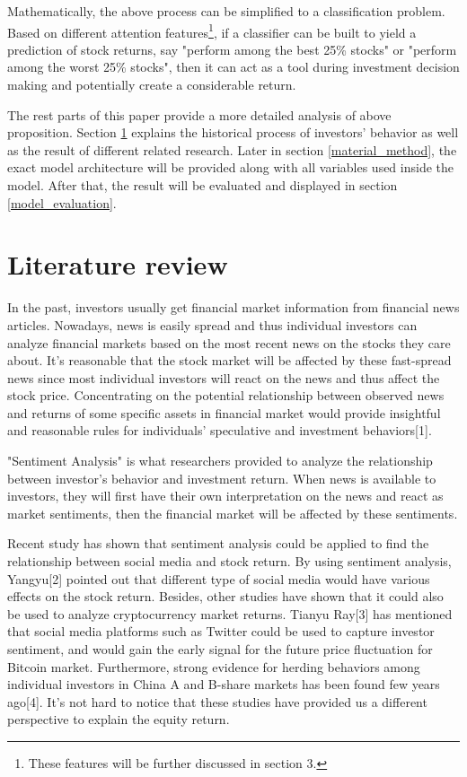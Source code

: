 \documentclass[letterpaper]{article}
\begin{document}
Mathematically, the above process can be simplified to a classification problem. Based on different attention features\footnote{These features will be further discussed in section 3.}, if a classifier can be built to yield a prediction of stock returns, say "perform among the best 25\% stocks" or "perform among the worst 25\% stocks", then it can act as a tool during investment decision making and potentially create a considerable return.

The rest parts of this paper provide a more detailed analysis of above proposition. Section \ref{literature_review} explains the historical process of investors' behavior as well as the result of different related research. Later in section \ref{material_method}, the exact model architecture will be provided along with all variables used inside the model. After that, the result will be evaluated and displayed in section \ref{model_evaluation}.


\section{Literature review}
\label{literature_review}

In the past, investors usually get financial market information from financial news articles. Nowadays, news is easily spread and thus individual investors can analyze financial markets based on the most recent news on the stocks they care about. It's reasonable that the stock market will be affected by these fast-spread news since most individual investors will react on the news and thus affect the stock price. Concentrating on the potential relationship between observed news and returns of some specific assets in financial market would provide insightful and reasonable rules for individuals' speculative and investment behaviors[1].


"Sentiment Analysis" is what researchers provided to analyze the relationship between investor's behavior and investment return. When news is available to investors, they will first have their own interpretation on the news and react as market sentiments, then the financial market will be affected by these sentiments.

Recent study has shown that sentiment analysis could be applied to find the relationship between social media and stock return. By using sentiment analysis, Yangyu[2] pointed out that different type of social media would have various effects on the stock return. Besides, other studies have shown that it could also be used to analyze cryptocurrency market returns. Tianyu Ray[3] has mentioned that social media platforms such as Twitter could be used to capture investor sentiment, and would gain the early signal for the future price fluctuation for Bitcoin market. Furthermore, strong evidence for herding behaviors among individual investors in China A and B-share markets has been found few years ago[4]. It's not hard to notice that these studies have provided us a different perspective to explain the equity return. 
\end{document}

